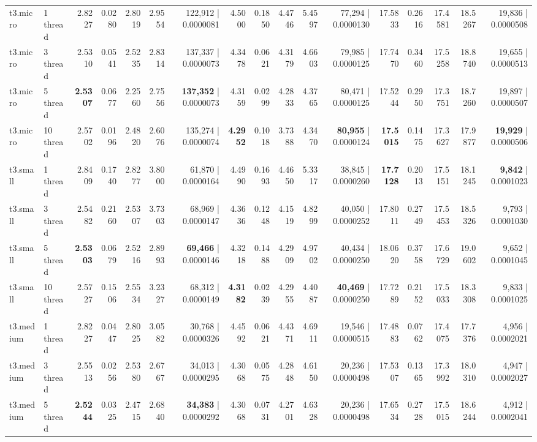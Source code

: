 \documentclass[conference]{IEEEtran}
\begin{document}
\begin{table}[h]
{\begin{tabular}{ll|rrrrr|rrrrr|rrrrr}
				\midrule
				t3.micro & 1 thread & 2.8227 & 0.0280 & 2.8019 & 2.9554 & 122,912 | 0.0000081 & 4.5000 & 0.1850 & 4.4746 & 5.4597 & 77,294 | 0.0000130 & 17.5833 & 0.2616 & 17.4581 & 18.5267 & 19,836 | 0.0000508 \\
				t3.micro & 3 thread & 2.5310 & 0.0541 & 2.5235 & 2.8314 & 137,337 | 0.0000073 & 4.3478 & 0.0621 & 4.3179 & 4.6603 & 79,985 | 0.0000125 & 17.7470 & 0.3460 & 17.5258 & 18.8740 & 19,655 | 0.0000513 \\
				t3.micro & 5 thread & \textbf{2.5307} & 0.0677 & 2.2560 & 2.7556 & \textbf{137,352} | 0.0000073 & 4.3159 & 0.0299 & 4.2833 & 4.3765 & 80,471 | 0.0000125 & 17.5244 & 0.2950 & 17.3751 & 18.7260 & 19,897 | 0.0000507 \\
				t3.micro & 10 thread & 2.5702 & 0.0196 & 2.4820 & 2.6076 & 135,274 | 0.0000074 & \textbf{4.2952} & 0.1018 & 3.7388 & 4.3470 & \textbf{80,955} | 0.0000124 & \textbf{17.5015} & 0.1475 & 17.3627 & 17.9877 & \textbf{19,929} | 0.0000506 \\
				\midrule
				t3.small & 1 thread & 2.8409 & 0.1740 & 2.8277 & 3.8000 & 61,870 | 0.0000164 & 4.4990 & 0.1693 & 4.4650 & 5.3317 & 38,845 | 0.0000260 & \textbf{17.7128} & 0.2013 & 17.5151 & 18.1245 & \textbf{9,842} | 0.0001023 \\
				t3.small & 3 thread & 2.5482 & 0.2160 & 2.5307 & 3.7303 & 68,969 | 0.0000147 & 4.3636 & 0.1248 & 4.1519 & 4.8299 & 40,050 | 0.0000252 & 17.8011 & 0.2749 & 17.5453 & 18.5326 & 9,793 | 0.0001030 \\
				t3.small & 5 thread & \textbf{2.5303} & 0.0679 & 2.5216 & 2.8993 & \textbf{69,466} | 0.0000146 & 4.3218 & 0.1488 & 4.2909 & 4.9702 & 40,434 | 0.0000250 & 18.0620 & 0.3758 & 17.6729 & 19.0602 & 9,652 | 0.0001045 \\
				t3.small & 10 thread & 2.5727 & 0.1506 & 2.5534 & 3.2327 & 68,312 | 0.0000149 & \textbf{4.3182} & 0.0239 & 4.2955 & 4.4087 & \textbf{40,469} | 0.0000250 & 17.7289 & 0.2152 & 17.5033 & 18.3308 & 9,833 | 0.0001025 \\
				\midrule
				t3.medium & 1 thread & 2.8227 & 0.0447 & 2.8025 & 3.0582 & 30,768 | 0.0000326 & 4.4592 & 0.0621 & 4.4371 & 4.6911 & 19,546 | 0.0000515 & 17.4883 & 0.0762 & 17.4075 & 17.7376 & 4,956 | 0.0002021 \\
				t3.medium & 3 thread & 2.5513 & 0.0256 & 2.5380 & 2.6767 & 34,013 | 0.0000295 & 4.3068 & 0.0575 & 4.2848 & 4.6150 & 20,236 | 0.0000498 & 17.5307 & 0.1365 & 17.3992 & 18.0310 & 4,947 | 0.0002027 \\
				t3.medium & 5 thread & \textbf{2.5244} & 0.0325 & 2.4715 & 2.6840 & \textbf{34,383} | 0.0000292 & 4.3068 & 0.0731 & 4.2701 & 4.6328 & 20,236 | 0.0000498 & 17.6534 & 0.2728 & 17.5015 & 18.6244 & 4,912 | 0.0002041 \\

\end{tabular}}
\end{table}
\end{document}
